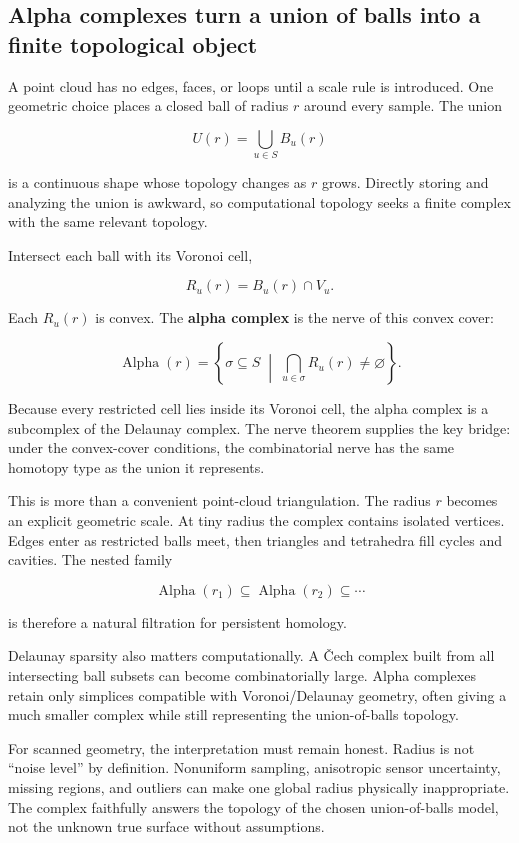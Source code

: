 \subsection{Alpha complexes turn a union of balls into a finite topological object}\label{03-visual-computing-i-ch002-alpha-complexes-turn-a-union-of-balls-into-a-finite-topological-object}

A point cloud has no edges, faces, or loops until a scale rule is introduced. One geometric choice places a closed ball of radius \(r\) around every sample. The union

\[
U(r)=
\bigcup_{u\in S} B_u(r)
\]

is a continuous shape whose topology changes as \(r\) grows. Directly storing and analyzing the union is awkward, so computational topology seeks a finite complex with the same relevant topology.

Intersect each ball with its Voronoi cell,

\[
R_u(r)
=
B_u(r)\cap V_u.
\]

Each \(R_u(r)\) is convex. The \textbf{alpha complex} is the nerve of this convex cover:

\[
\operatorname{Alpha}(r)
=
\left\{
\sigma\subseteq S
\;\middle|\;
\bigcap_{u\in\sigma}R_u(r)\neq\varnothing
\right\}.
\]

Because every restricted cell lies inside its Voronoi cell, the alpha complex is a subcomplex of the Delaunay complex. The nerve theorem supplies the key bridge: under the convex-cover conditions, the combinatorial nerve has the same homotopy type as the union it represents.

This is more than a convenient point-cloud triangulation. The radius \(r\) becomes an explicit geometric scale. At tiny radius the complex contains isolated vertices. Edges enter as restricted balls meet, then triangles and tetrahedra fill cycles and cavities. The nested family

\[
\operatorname{Alpha}(r_1)
\subseteq
\operatorname{Alpha}(r_2)
\subseteq\cdots
\]

is therefore a natural filtration for persistent homology.

Delaunay sparsity also matters computationally. A Čech complex built from all intersecting ball subsets can become combinatorially large. Alpha complexes retain only simplices compatible with Voronoi/Delaunay geometry, often giving a much smaller complex while still representing the union-of-balls topology.

For scanned geometry, the interpretation must remain honest. Radius is not ``noise level'' by definition. Nonuniform sampling, anisotropic sensor uncertainty, missing regions, and outliers can make one global radius physically inappropriate. The complex faithfully answers the topology of the chosen union-of-balls model, not the unknown true surface without assumptions.

